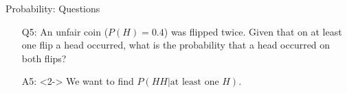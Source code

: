 \documentclass[10pt, xcolor=table]{beamer}
\begin{document}
\begin{frame}{Probability: Questions}

\begin{itemize}
  \setlength{\itemsep}{15pt}
\item[Q5:] An unfair coin ($P(H) = 0.4$) was flipped twice. Given that on at least one flip a head occurred, what is the probability that a head occurred on both flips?
\item[A5:]<2-> \color{red} 
We want to find $P(HH | \text{at least one } H)$.
\end{itemize}
\end{frame}
\end{document}
